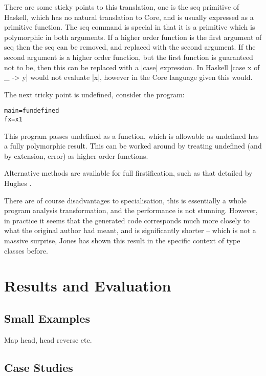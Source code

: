 \documentclass[preprint]{sigplanconf}
\newcommand{\C}[1]{\textsf{#1}}
\newenvironment{code}{\begin{alltt}\small}{\end{alltt}}
\begin{document}
There are some sticky points to this translation, one is the \C{seq} primitive of Haskell, which has no natural translation to Core, and is usually expressed as a primitive function. The \C{seq} command is special in that it is a primitive which is polymorphic in both arguments. If a higher order function is the first argument of \C{seq} then the \C{seq} can be removed, and replaced with the second argument. If the second argument is a higher order function, but the first function is guaranteed not to be, then this can be replaced with a |case| expression. In Haskell |case x of _ -> y| would not evaluate |x|, however in the Core language given this would.

The next tricky point is \C{undefined}, consider the program:

\begin{code}
main = f undefined
f x = x 1
\end{code}

This program passes \C{undefined} as a function, which is allowable as \C{undefined} has a fully polymorphic result. This can be worked around by treating \C{undefined} (and by extension, \C{error}) as higher order functions.

Alternative methods are available for full firstification, such as that detailed by Hughes \cite{hughes:type-spec}.

There are of course disadvantages to specialisation, this is essentially a whole program analysis transformation, and the performance is not stunning. However, in practice it seems that the generated code corresponds much more closely to what the original author had meant, and is significantly shorter -- which is not a massive surprise, Jones has shown this result in the specific context of type classes before.


\section{Results and Evaluation}
\label{sec:results}

\subsection{Small Examples}

Map head, head reverse etc.


\subsection{Case Studies}
\end{document}
